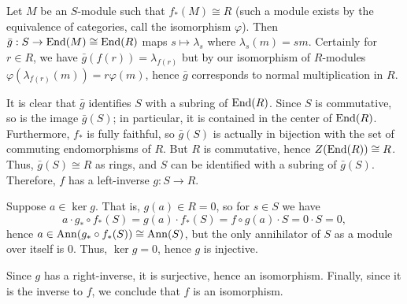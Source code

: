 \documentclass[../../master.tex]{subfiles}
\begin{document}
\begin{solution}
    Let $M$ be an $S$-module such that $f_*(M) \cong R$ (such a module exists by the equivalence of categories, call the isomorphism $\varphi$).
    Then $\bar{g}: S \to \operatorname{End}(M) \cong \operatorname{End}(R)$ maps $s \mapsto \lambda_s$ where $\lambda_s(m) = sm$.
    Certainly for $r \in R$, we have $\bar{g}(f(r)) = \lambda_{f(r)}$ but by our isomorphism of $R$-modules $\varphi(\lambda_{f(r)}(m)) = r \varphi(m)$, hence $\bar{g}$ corresponds to normal multiplication in $R$.

    It is clear that $\bar{g}$ identifies $S$ with a subring of $\operatorname{End}(R)$.
    Since $S$ is commutative, so is the image $\bar{g}(S)$; in particular, it is contained in the center of $\operatorname{End}(R)$.
    Furthermore, $f_*$ is fully faithful, so $\bar{g}(S)$ is actually in bijection with the set of commuting endomorphisms of $R$.
    But $R$ is commutative, hence $Z(\operatorname{End}(R)) \cong R$.
    Thus, $\bar{g}(S) \cong R$ as rings, and $S$ can be identified with a subring of $\bar{g}(S)$.
    Therefore, $f$ has a left-inverse $g : S \to R$.
    
    Suppose $a \in \ker g$.
    That is, $g(a) \in R = 0$, so for $s \in S$ we have
    \[
    a \cdot g_* \circ f_*(S) = g(a) \cdot f_*(S) = f \circ g(a) \cdot S = 0 \cdot S = 0,
    \]
    hence $a \in \operatorname{Ann}(g_* \circ f_*(S)) \cong \operatorname{Ann}(S)$, but the only annihilator of $S$ as a module over itself is $0$.
    Thus, $\ker g = 0$, hence $g$ is injective.

    Since $g$ has a right-inverse, it is surjective, hence an isomorphism.
    Finally, since it is the inverse to $f$, we conclude that $f$ is an isomorphism.
\end{solution}
\end{document}
